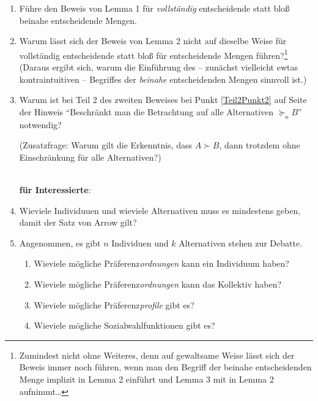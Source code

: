 \begin{enumerate}
  Zusatzfrage: Könnte man am Ende von Teil 1 sagen, dass die Menge aller
  Individuen bis zum "`zentralen Individuum"', beinahe entscheidend für $B$
  über $A$ (oder anstelle von $A$ für irgend eine andere Alternative außer $B$)
  ist? 
  
  ~\\{\bf schwere Aufgaben:}
 
  \item \label{AufgArrow3} Führe den Beweis von Lemma 1 für {\em vollständig}
  entscheidende statt bloß beinahe entscheidende Mengen.
  
  \item \label{AufgArrow6} Warum lässt sich der Beweis von Lemma 2 nicht
  auf dieselbe Weise für vollständig
  entscheidende statt bloß für entscheidende Mengen führen?\footnote{Zumindest
  nicht ohne Weiteres, denn auf gewaltsame Weise lässt sich der Beweis immer
  noch führen, wenn man den Begriff der beinahe entscheidenden Menge implizit
  in Lemma 2 einführt und Lemma 3 mit in Lemma 2 aufnimmt\ldots} (Daraus ergibt
  sich, warum die Einführung des -- zunächst vielleicht ewtas kontraintuitiven
  -- Begriffes der {\em beinahe} entscheidenden Mengen sinnvoll ist.)
 
  \item \label{AufgArrow7} Warum ist bei Teil 2 des zweiten Beweises bei Punkt
  \ref{Teil2Punkt2} auf Seite \pageref{Teil2Punkt2} der 
  Hinweis "`Beschränkt man die Betrachtung auf alle Alternativen
  $\succeq_n B$"' notwendig? 
  
  (Zusatzfrage: Warum gilt die Erkenntnis,
  dass $A \succ B$, dann trotzdem ohne Einschränkung für alle Alternativen?)
 
  
  ~\\{\bf für Interessierte}:  

  \item Wieviele Individuuen und wieviele Alternativen muss es mindestens
  geben, damit der Satz von Arrow gilt?
  
  \item Angenommen, es gibt $n$ Individuen und $k$ Alternativen stehen zur
  Debatte.
  \begin{enumerate}
    \item Wieviele mögliche Präferenz{\em ordnungen} kann ein Individuum haben?
    \item Wieviele mögliche Präferenz{\em ordnungen} kann das Kollektiv haben?
    \item Wieviele mögliche Präferenz{\em profile} gibt es?
    \item Wieviele mögliche Sozialwahlfunktionen gibt es?
  \end{enumerate}
  

\end{enumerate}
